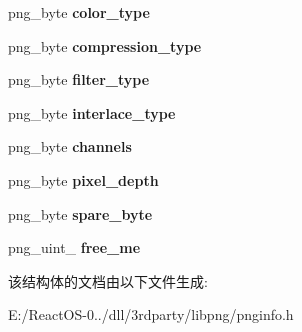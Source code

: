 \begin{DoxyCompactItemize}
png\+\_\+byte {\bfseries color\+\_\+type}
\item 
\mbox{\label{structpng__info__def_ab282a14aee6f0e080a7a4399b412fd20}} 
png\+\_\+byte {\bfseries compression\+\_\+type}
\item 
\mbox{\label{structpng__info__def_aa9a869f34f99f9d02e476892e68a26ea}} 
png\+\_\+byte {\bfseries filter\+\_\+type}
\item 
\mbox{\label{structpng__info__def_afad8a12cf463fed8ab5fe29e3d85b6c1}} 
png\+\_\+byte {\bfseries interlace\+\_\+type}
\item 
\mbox{\label{structpng__info__def_ab0bafa25f05331940beb673783b1fac8}} 
png\+\_\+byte {\bfseries channels}
\item 
\mbox{\label{structpng__info__def_ab98a44dd6a8e1c0258019469c77ffa2b}} 
png\+\_\+byte {\bfseries pixel\+\_\+depth}
\item 
\mbox{\label{structpng__info__def_a09cbd4c9a9727499a9e2deba0a8e9134}} 
png\+\_\+byte {\bfseries spare\+\_\+byte}
\item 
\mbox{\label{structpng__info__def_a80f147934033ea3c3da1addd182b7ef3}} 
png\+\_\+uint\+\_ {\bfseries free\+\_\+me}
\end{DoxyCompactItemize}


该结构体的文档由以下文件生成\+:\begin{DoxyCompactItemize}
\item 
E\+:/\+React\+O\+S-\/0../dll/3rdparty/libpng/pnginfo.\+h\end{DoxyCompactItemize}
